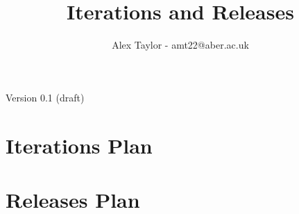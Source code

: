 \documentclass{article}
\title{Iterations and Releases}
\author{Alex Taylor - amt22@aber.ac.uk}
\begin{document}
\maketitle
\begin{center}
	Version 0.1 (draft)
\end{center}
\tableofcontents
\thispagestyle{empty}
\newpage

\section{Iterations Plan}

\section{Releases Plan}
\end{document}
